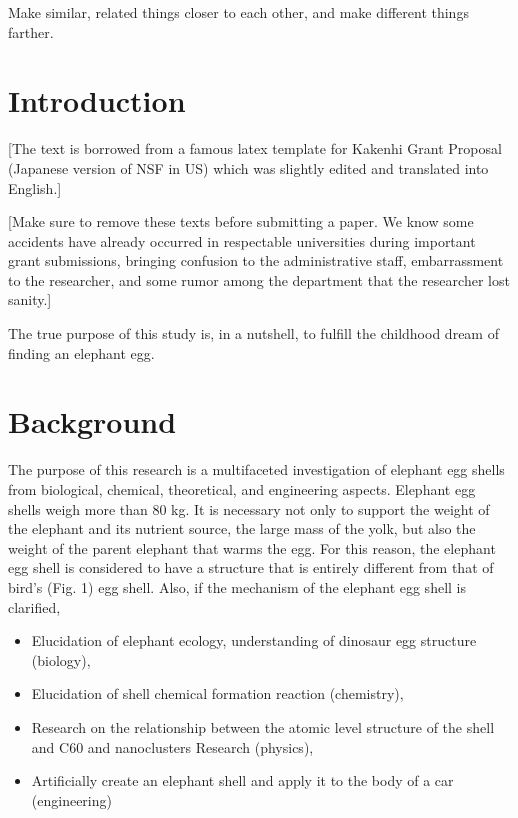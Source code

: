 Make similar, related things closer to each other,
and make different things farther.





\section{Introduction}

[The text is borrowed from a famous latex template for Kakenhi Grant
Proposal (Japanese version of NSF in US) which was slightly edited and translated into English.]

[Make sure to remove these texts before submitting a paper.
We know some accidents have already occurred in respectable universities during important grant submissions,
bringing confusion to the administrative staff, embarrassment to the researcher,
and some rumor among the department that the researcher lost sanity.]


The true purpose of this study is, in a nutshell, to fulfill the childhood dream of finding an elephant egg.

\section{Background}

The purpose of this research is
a multifaceted investigation of elephant egg shells from biological, chemical, theoretical, and engineering aspects.
Elephant egg shells weigh more than 80 kg.
It is necessary not only to support the weight of the elephant and its
nutrient source, the large mass of the yolk, but also the weight of the
parent elephant that warms the egg. For this reason, the elephant egg
shell is considered to have a structure that is entirely different
from that of bird's (Fig. 1) egg shell. Also, if the mechanism
of the elephant egg shell is clarified,

\begin{itemize}
 \item Elucidation of elephant ecology, understanding of dinosaur egg structure (biology),
 \item Elucidation of shell chemical formation reaction (chemistry),
 \item Research on the relationship between the atomic level structure of the shell and C60 and nanoclusters Research (physics),
 \item Artificially create an elephant shell and apply it to the body of a car (engineering)
\end{itemize}

